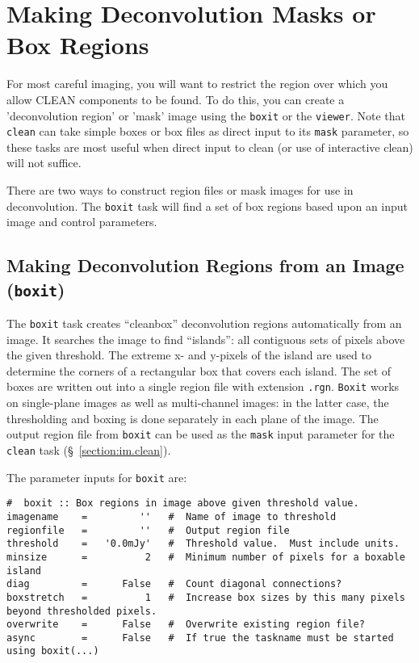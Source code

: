 \section{Making Deconvolution Masks or Box Regions}
\label{section:im.mask}

For most careful imaging, you will want to restrict the region over
which you allow CLEAN components to be found.  To do this, you can
create a 'deconvolution region' or 'mask' image using the {\tt boxit}
or the {\tt viewer}.
Note that {\tt clean} can take simple boxes
or box files as direct input to its {\tt mask} parameter, so these
tasks are most useful when direct input to clean (or use of
interactive clean) will not suffice.

There are two ways to construct region files or mask images for use
in deconvolution.  The {\tt boxit} task will find a set of box regions
based upon an input image and control parameters.  

\subsection{Making Deconvolution Regions from an Image ({\tt boxit})}
\label{section:im.mask.boxit}

The {\tt boxit} task creates ``cleanbox'' deconvolution regions automatically
from an image.  It searches the image to find ``islands'': all contiguous
sets of pixels above the given threshold.  The extreme x- and y-pixels of the
island are used to determine the corners of a rectangular box that covers each
island.  The set of boxes are written out into a single region file with
extension {\tt .rgn}.  {\tt Boxit} works on single-plane images as well as
multi-channel images: in the latter case, the thresholding and boxing is done
separately in each plane of the image.  The output region file from {\tt boxit}
can be used as the {\tt mask} input parameter for the {\tt clean} task
(\S~\ref{section:im.clean}).

The parameter inputs for {\tt boxit} are:
\small
\begin{verbatim}
#  boxit :: Box regions in image above given threshold value.
imagename    =         ''   #  Name of image to threshold
regionfile   =         ''   #  Output region file
threshold    =   '0.0mJy'   #  Threshold value.  Must include units.
minsize      =          2   #  Minimum number of pixels for a boxable island
diag         =      False   #  Count diagonal connections?
boxstretch   =          1   #  Increase box sizes by this many pixels beyond thresholded pixels.
overwrite    =      False   #  Overwrite existing region file?
async        =      False   #  If true the taskname must be started using boxit(...)
\end{verbatim}
\normalsize 

